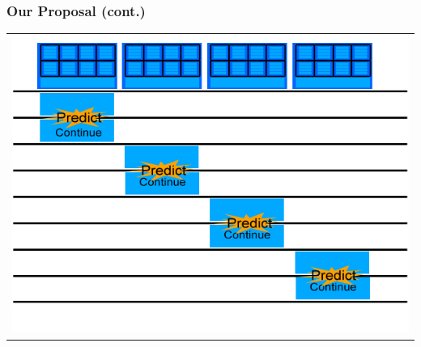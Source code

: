 \documentclass{beamer}
\begin{document}
\begin{frame}
	\frametitle{Our Proposal (cont.)}
	\begin{tabular}{c}
		\includegraphics[width=.75\textwidth]{GPU-predict-context.jpg}
	\end{tabular}
\end{frame}
\end{document}
